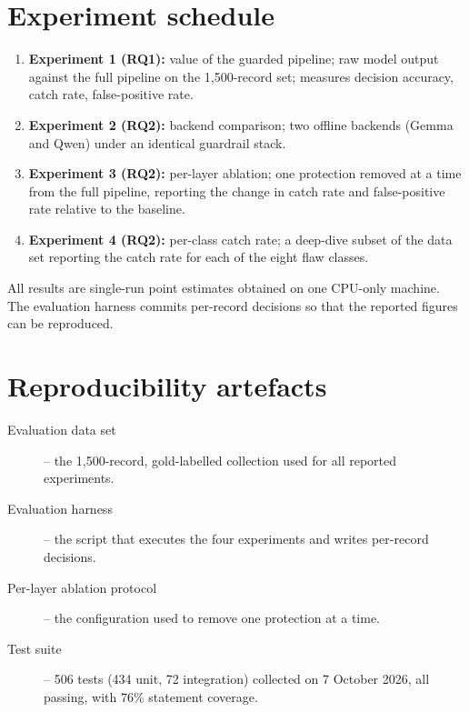 \section{Experiment schedule}

\begin{enumerate}
  \item \textbf{Experiment 1 (RQ1):} value of the guarded pipeline; raw model
  output against the full pipeline on the 1,500-record set; measures decision
  accuracy, catch rate, false-positive rate.
  \item \textbf{Experiment 2 (RQ2):} backend comparison; two offline backends
  (Gemma and Qwen) under an identical guardrail stack.
  \item \textbf{Experiment 3 (RQ2):} per-layer ablation; one protection removed
  at a time from the full pipeline, reporting the change in catch rate and
  false-positive rate relative to the baseline.
  \item \textbf{Experiment 4 (RQ2):} per-class catch rate; a deep-dive subset of
  the data set reporting the catch rate for each of the eight flaw classes.
\end{enumerate}

All results are single-run point estimates obtained on one CPU-only machine. The
evaluation harness commits per-record decisions so that the reported figures
can be reproduced.

\section{Reproducibility artefacts}

\begin{description}
  \item[Evaluation data set] -- the 1,500-record, gold-labelled collection used
  for all reported experiments.
  \item[Evaluation harness] -- the script that executes the four experiments and
  writes per-record decisions.
  \item[Per-layer ablation protocol] -- the configuration used to remove one
  protection at a time.
  \item[Test suite] -- 506 tests (434 unit, 72 integration) collected on
  7 October 2026, all passing, with 76\% statement coverage.
\end{description}